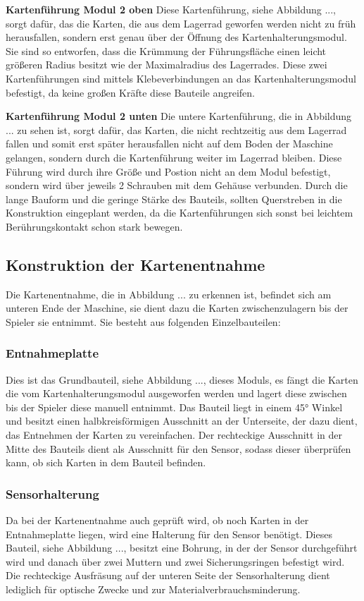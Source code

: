\textbf{Kartenführung Modul 2 oben}
Diese Kartenführung, siehe Abbildung ..., sorgt dafür, das die Karten, die aus dem Lagerrad geworfen werden nicht zu früh herausfallen,
sondern erst genau über der Öffnung des Kartenhalterungsmodul. Sie sind so entworfen, dass die Krümmung der Führungsfläche einen leicht
größeren Radius besitzt wie der Maximalradius des Lagerrades. Diese zwei Kartenführungen sind mittels Klebeverbindungen
an das Kartenhalterungsmodul befestigt, da keine großen Kräfte diese Bauteile angreifen.

\textbf{Kartenführung Modul 2 unten}
Die untere Kartenführung, die in Abbildung ... zu sehen ist, sorgt dafür, das Karten, die nicht rechtzeitig aus dem Lagerrad fallen und somit erst später
herausfallen nicht auf dem Boden der Maschine gelangen, sondern durch die Kartenführung weiter im Lagerrad bleiben. Diese Führung
wird durch ihre Größe und Postion nicht an dem Modul befestigt, sondern wird über jeweils 2 Schrauben mit dem Gehäuse
verbunden. Durch die lange Bauform und die geringe Stärke des Bauteils, sollten Querstreben in die Konstruktion eingeplant werden,
da die Kartenführungen sich sonst bei leichtem Berührungskontakt schon stark bewegen.

\subsection{Konstruktion der Kartenentnahme}
Die Kartenentnahme, die in Abbildung ... zu erkennen ist, befindet sich am unteren Ende der Maschine, sie dient dazu die Karten zwischenzulagern bis der Spieler
sie entnimmt. Sie besteht aus folgenden Einzelbauteilen:

\subsubsection{Entnahmeplatte }
Dies ist das Grundbauteil, siehe Abbildung ..., dieses Moduls, es fängt die Karten die vom Kartenhalterungsmodul ausgeworfen werden und lagert diese zwischen bis
der Spieler diese manuell entnimmt. Das Bauteil liegt in einem 45° Winkel und besitzt einen halbkreisförmigen Ausschnitt
an der Unterseite, der dazu dient, das Entnehmen der Karten zu vereinfachen. Der rechteckige Ausschnitt in der Mitte des
Bauteils dient als Ausschnitt für den Sensor, sodass dieser überprüfen kann, ob sich Karten in dem Bauteil befinden.

\subsubsection{Sensorhalterung}
Da bei der Kartenentnahme auch geprüft wird, ob noch Karten in der Entnahmeplatte liegen, wird eine Halterung für den
Sensor benötigt. Dieses Bauteil, siehe Abbildung ..., besitzt eine Bohrung, in der der Sensor durchgeführt wird und danach über zwei Muttern und
zwei Sicherungsringen befestigt wird. Die rechteckige Ausfräsung auf der unteren Seite der Sensorhalterung dient lediglich
für optische Zwecke und zur Materialverbrauchsminderung.

